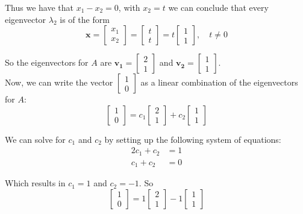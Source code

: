 Thus we have that $x_1 - x_2 = 0$, with $x_2=t$ we can conclude that every eigenvector $\lambda_2$ is of the form
\[
	\mathbf{x} = \begin{bmatrix}x_1\\x_2\end{bmatrix} = \begin{bmatrix}t\\t\end{bmatrix} = t\begin{bmatrix}1\\1\end{bmatrix}, \quad t\neq 0
\]

So the eigenvectors for $A$ are $\mathbf{v_1} = \begin{bmatrix}2\\1\end{bmatrix}$ and $\mathbf{v_2} = \begin{bmatrix}1\\1\end{bmatrix}$.\\[2ex]
Now, we can write the vector $\begin{bmatrix}1\\0\end{bmatrix}$ as a linear combination of the eigenvectors for $A$:
\[
	\begin{bmatrix}1\\0\end{bmatrix} = c_1\begin{bmatrix}2\\1\end{bmatrix} + c_2\begin{bmatrix}1\\1\end{bmatrix}
\]

We can solve for $c_1$ and $c_2$ by setting up the following system of equations:
\begin{align*}
	2c_1 + c_2 & = 1 \\
	c_1 + c_2  & = 0
\end{align*}

Which results in $c_1 = 1$ and $c_2 = -1$. So
\[
	\begin{bmatrix}1\\0\end{bmatrix} = 1\begin{bmatrix}2\\1\end{bmatrix} - 1\begin{bmatrix}1\\1\end{bmatrix}
\]

